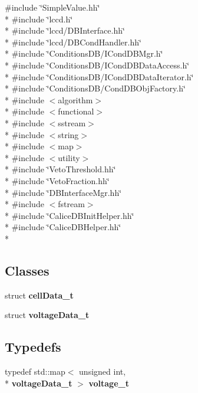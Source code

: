 {\ttfamily \#include \char`\"{}Simple\-Value.\-hh\char`\"{}}\\*
{\ttfamily \#include \char`\"{}lccd.\-h\char`\"{}}\\*
{\ttfamily \#include \char`\"{}lccd/\-D\-B\-Interface.\-hh\char`\"{}}\\*
{\ttfamily \#include \char`\"{}lccd/\-D\-B\-Cond\-Handler.\-hh\char`\"{}}\\*
{\ttfamily \#include \char`\"{}Conditions\-D\-B/\-I\-Cond\-D\-B\-Mgr.\-h\char`\"{}}\\*
{\ttfamily \#include \char`\"{}Conditions\-D\-B/\-I\-Cond\-D\-B\-Data\-Access.\-h\char`\"{}}\\*
{\ttfamily \#include \char`\"{}Conditions\-D\-B/\-I\-Cond\-D\-B\-Data\-Iterator.\-h\char`\"{}}\\*
{\ttfamily \#include \char`\"{}Conditions\-D\-B/\-Cond\-D\-B\-Obj\-Factory.\-h\char`\"{}}\\*
{\ttfamily \#include $<$algorithm$>$}\\*
{\ttfamily \#include $<$functional$>$}\\*
{\ttfamily \#include $<$sstream$>$}\\*
{\ttfamily \#include $<$string$>$}\\*
{\ttfamily \#include $<$map$>$}\\*
{\ttfamily \#include $<$utility$>$}\\*
{\ttfamily \#include \char`\"{}Veto\-Threshold.\-hh\char`\"{}}\\*
{\ttfamily \#include \char`\"{}Veto\-Fraction.\-hh\char`\"{}}\\*
{\ttfamily \#include \char`\"{}D\-B\-Interface\-Mgr.\-hh\char`\"{}}\\*
{\ttfamily \#include $<$fstream$>$}\\*
{\ttfamily \#include \char`\"{}Calice\-D\-B\-Init\-Helper.\-hh\char`\"{}}\\*
{\ttfamily \#include \char`\"{}Calice\-D\-B\-Helper.\-hh\char`\"{}}\\*
\subsection*{Classes}
\begin{DoxyCompactItemize}
\item 
struct {\bf cell\-Data\-\_\-t}
\item 
struct {\bf voltage\-Data\-\_\-t}
\end{DoxyCompactItemize}
\subsection*{Typedefs}
\begin{DoxyCompactItemize}
\item 
typedef std\-::map$<$ unsigned int, \\*
{\bf voltage\-Data\-\_\-t} $>$ {\bfseries voltage\-\_\-t}\label{extractGainVsTemp_8cc_ad7fd3ccb1c9df8fe38900ac1302addfb}

\end{DoxyCompactItemize}
